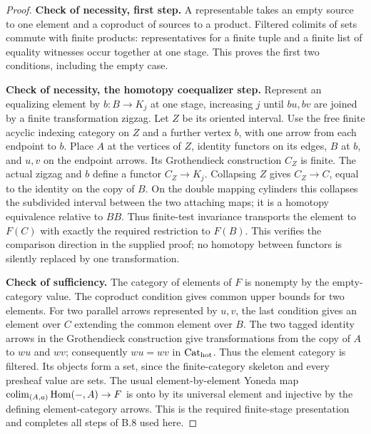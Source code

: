 \begin{proof}
\textbf{Check of necessity, first step.} A representable takes an empty
source to one element and a coproduct of sources to a product. Filtered
colimits of sets commute with finite products: representatives for a
finite tuple and a finite list of equality witnesses occur together at
one stage. This proves the first two conditions, including the empty case.

\textbf{Check of necessity, the homotopy coequalizer step.} Represent an
equalizing element by $b:B\to K_j$ at one stage, increasing $j$ until
$bu,bv$ are joined by a finite transformation zigzag. Let $Z$ be its
oriented interval. Use the free finite acyclic indexing category on $Z$
and a further vertex $b$, with one arrow from each endpoint to $b$.
Place $A$ at the vertices of $Z$, identity functors on its edges, $B$ at
$b$, and $u,v$ on the endpoint arrows. Its Grothendieck construction
$C_Z$ is finite. The actual zigzag and $b$ define a functor $C_Z\to K_j$.
Collapsing $Z$ gives $C_Z\to C$, equal to the identity on the copy of
$B$. On the double mapping cylinders this collapses the subdivided
interval between the two attaching maps; it is a homotopy equivalence
relative to $BB$. Thus finite-test invariance transports the element to
$F(C)$ with exactly the required restriction to $F(B)$. This verifies the
comparison direction in the supplied proof; no homotopy between functors
is silently replaced by one transformation.

\textbf{Check of sufficiency.} The category of elements of $F$ is nonempty
by the empty-category value. The coproduct condition gives common upper
bounds for two elements. For two parallel arrows represented by $u,v$,
the last condition gives an element over $C$ extending the common element
over $B$. The two tagged identity arrows in the Grothendieck construction
give transformations from the copy of $A$ to $wu$ and $wv$; consequently
$wu=wv$ in $\mathrm {Cat}_{\mathrm{hot}}$. Thus the element category is filtered.
Its objects form a set, since the finite-category skeleton and every
presheaf value are sets. The usual element-by-element Yoneda map
$\operatorname{colim}_{(A,a)}\operatorname{Hom}(-,A)\to F$ is onto by its universal element and
injective by the defining element-category arrows. This is the required
finite-stage presentation and completes all steps of B.8 used here.
\end{proof}

